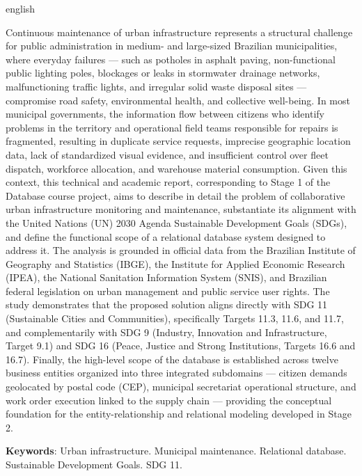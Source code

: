 \begin{resumo}[Abstract]
\begin{otherlanguage*}{english}
\begin{SingleSpacing}
Continuous maintenance of urban infrastructure represents a structural challenge for public administration in medium- and large-sized Brazilian municipalities, where everyday failures --- such as potholes in asphalt paving, non-functional public lighting poles, blockages or leaks in stormwater drainage networks, malfunctioning traffic lights, and irregular solid waste disposal sites --- compromise road safety, environmental health, and collective well-being. In most municipal governments, the information flow between citizens who identify problems in the territory and operational field teams responsible for repairs is fragmented, resulting in duplicate service requests, imprecise geographic location data, lack of standardized visual evidence, and insufficient control over fleet dispatch, workforce allocation, and warehouse material consumption. Given this context, this technical and academic report, corresponding to Stage 1 of the Database course project, aims to describe in detail the problem of collaborative urban infrastructure monitoring and maintenance, substantiate its alignment with the United Nations (UN) 2030 Agenda Sustainable Development Goals (SDGs), and define the functional scope of a relational database system designed to address it. The analysis is grounded in official data from the Brazilian Institute of Geography and Statistics (IBGE), the Institute for Applied Economic Research (IPEA), the National Sanitation Information System (SNIS), and Brazilian federal legislation on urban management and public service user rights. The study demonstrates that the proposed solution aligns directly with SDG 11 (Sustainable Cities and Communities), specifically Targets 11.3, 11.6, and 11.7, and complementarily with SDG 9 (Industry, Innovation and Infrastructure, Target 9.1) and SDG 16 (Peace, Justice and Strong Institutions, Targets 16.6 and 16.7). Finally, the high-level scope of the database is established across twelve business entities organized into three integrated subdomains --- citizen demands geolocated by postal code (CEP), municipal secretariat operational structure, and work order execution linked to the supply chain --- providing the conceptual foundation for the entity-relationship and relational modeling developed in Stage 2.

\vspace{\onelineskip}
\noindent
\textbf{Keywords}: Urban infrastructure. Municipal maintenance. Relational database. Sustainable Development Goals. SDG 11.
\end{SingleSpacing}
\end{otherlanguage*}
\end{resumo}
